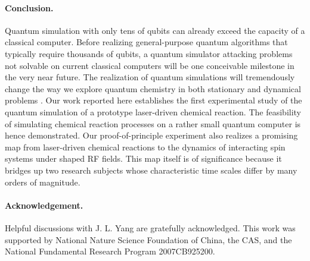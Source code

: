 \documentclass[twocolumn,showpacs,twoside,10pt,prl]{revtex4}
\begin{document}
\paragraph*{Conclusion.}

 Quantum simulation with only tens of qubits can already exceed the capacity of a classical computer.  Before realizing general-purpose quantum algorithms that typically require thousands of qubits, a quantum simulator attacking problems not solvable on current classical computers will be one conceivable milestone in the very near future. The realization of quantum simulations will tremendously change the way we explore quantum chemistry in both stationary and dynamical problems \cite{static,dynamical}.   %
Our work reported here establishes the first experimental study of the quantum simulation of a prototype laser-driven chemical reaction. The feasibility of simulating chemical reaction processes on a rather small quantum computer is hence demonstrated.  Our proof-of-principle experiment also realizes a promising map from laser-driven chemical reactions to the dynamics of interacting spin systems under shaped RF fields. This map itself is of significance because it bridges up two research subjects whose characteristic time scales differ by many orders of magnitude.




\paragraph*{Acknowledgement.}

Helpful discussions with J. L. Yang are gratefully acknowledged.
This work was supported by National Nature Science Foundation of China, the CAS, and the National Fundamental Research Program 2007CB925200.
\end{document}
